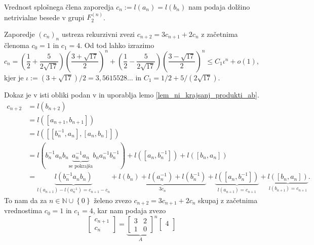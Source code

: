 Vrednost splošnega člena zaporedja $c_n := l(a_n) = l(b_n)$ nam podaja dolžino netrivialne besede v grupi $F_2^{(n)}$.
\begin{lema}
\label{lem_vrednost_cn}
Zaporedje $(c_n)_n$ ustreza rekurzivni zvezi $c_{n+2} = 3 c_{n+1} + 2c_{n}$ z začetnima členoma $c_0 = 1$ in $c_1 = 4$. Od tod lahko izrazimo \begin{equation*}
c_{n} = \left( \frac{1}{2} + \frac{5}{2 \sqrt{17}} \right) \left( \frac{3 + \sqrt{17} }{2} \right)^{n} +  \left( \frac{1}{2} - \frac{5}{2 \sqrt{17}} \right) \left( \frac{3 - \sqrt{17} }{2} \right)^{n} \le C_1 \iota^{n} + o(1),
\end{equation*}
kjer je $\iota := (3 + \sqrt{17} ) / 2 = 3{,}5615528 \ldots $ in $C_1 = 1/ 2 + 5 / (2 \sqrt{17} )$. 
\end{lema}  
\begin{dokaz}
    Dokaz je v isti obliki podan v \cite{Schneider_2016} in uporablja lemo \ref{lem_ni_krajsanj_produkti_ab}.
    \begin{align*}
        c_{n+2} &= l(b_{n+2}) \\
         &= l([a_{n + 1}, b_{n+1}])\\
         &= l([[b_n ^{-1}, a_{n}], [a_{n}, b_{n}]]) \\
         &= l(b_{n} ^{-1} a_{n} b_{n} \underbrace{a_{n} ^{-1} a_{n}}_{\text{se pokrajša}}  b_{n} a_{n} ^{-1} b_{n} ^{-1}) + l([a_{n}, b_{n} ^{-1}]) + l([b_{n}, a_{n}]) \\
         &= \underbrace{l(b_{n} ^{-1} a_{n} b_{n})}_{l(a_{n + 1}) - l(a_{n}^{-1}) = c_{n+1} - c_{n}}  + \underbrace{l(b_{n}) + l(a_{n} ^{-1}) + l(b_{n} ^{-1})}_{3 c_{n}}  + \underbrace{l([a_{n} , b_{n}^{-1}])}_{l(a_{n + 1}) = c_{n+1}}  + \underbrace{l([b_{n}, a_{n}])}_{l(b_{n+1}) = c_{n+1}}. 
    \end{align*}
    To nam da za $n \in \mathbb{N} \cup  \left\{ 0 \right\}$ želeno zvezo $c_{n+2} = 3 c_{n+1} + 2c_{n}$ skupaj z začetnima vrednostima $c_0 = 1$ in $c_1 = 4$, kar nam podaja zvezo \begin{equation*}
    \begin{bmatrix}
        c_{n+ 1}\\
        c_{n} 
    \end{bmatrix} = {\underbrace{\begin{bmatrix}
        3 & 2\\
        1 & 0
    \end{bmatrix}}_{A}}^{n}  \begin{bmatrix}
        4 \\

\end{bmatrix}
\end{equation*}
\end{dokaz}
